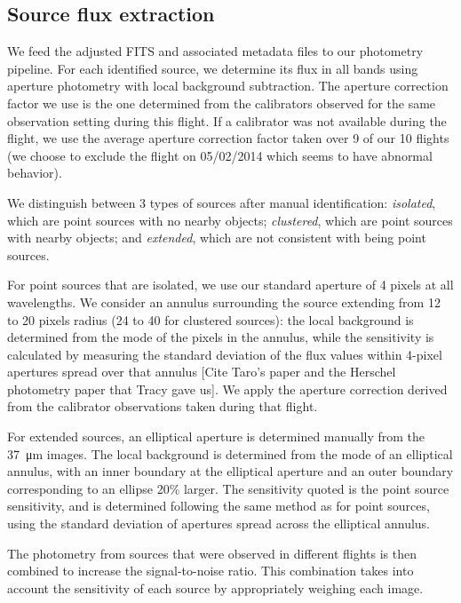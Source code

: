 \subsection{Source flux extraction}

We feed the adjusted FITS and associated metadata files to our photometry pipeline. For each identified source, we determine its flux in all bands using aperture photometry with local background subtraction. The aperture correction factor we use is the one determined from the calibrators observed for the same observation setting during this flight. If a calibrator was not available during the flight, we use the average aperture correction factor taken over 9 of our 10 flights (we choose to exclude the flight on 05/02/2014 which seems to have abnormal behavior).

We distinguish between 3 types of sources after manual identification: \textit{isolated}, which are point sources with no nearby objects; \textit{clustered}, which are point sources with nearby objects; and \textit{extended}, which are not consistent with being point sources. 

For point sources that are isolated, we use our standard aperture of 4 pixels at all wavelengths. We consider an annulus surrounding the source extending from 12 to 20 pixels radius (24 to 40 for clustered sources): the local background is determined from the mode of the pixels in the annulus, while the sensitivity is calculated by measuring the standard deviation of the flux values within 4-pixel apertures spread over that annulus [Cite Taro's paper and the Herschel photometry paper that Tracy gave us]. We apply the aperture correction derived from the calibrator observations taken during that flight.

For extended sources, an elliptical aperture is determined manually from the \SI{37}{\micro\meter} images. The local background is determined from the mode of an elliptical annulus, with an inner boundary at the elliptical aperture and an outer boundary corresponding to an ellipse 20\% larger. The sensitivity quoted is the point source sensitivity, and is determined following the same method as for point sources, using the standard deviation of apertures spread across the elliptical annulus. 

The photometry from sources that were observed in different flights is then combined to increase the signal-to-noise ratio. This combination takes into account the sensitivity of each source by appropriately weighing each image.

